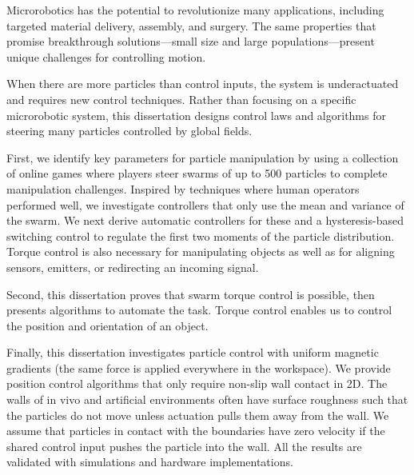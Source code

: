 


Microrobotics has the potential to revolutionize many applications, including targeted material delivery, assembly, and surgery.  The same properties that promise breakthrough solutions---small size and large populations---present unique challenges for controlling motion. 

 When there are more particles than control inputs, the system is underactuated and requires new control techniques.
 Rather than focusing on a specific microrobotic system, this dissertation designs control laws and algorithms for steering many particles controlled by global fields.

 
 First, we identify key parameters for particle manipulation by using a collection of online games where players steer swarms of up to 500 particles to complete manipulation challenges. Inspired by techniques where human operators performed well, we investigate controllers that only use the mean and variance of the swarm. We next derive automatic controllers for these and a hysteresis-based switching control to regulate the first two moments of the particle distribution. Torque control is also necessary for manipulating objects as well as for aligning sensors, emitters, or redirecting an incoming signal. 
 
 Second, this dissertation proves that swarm torque control is possible, then presents algorithms to automate the task. Torque control enables us to control the position and orientation of an object.

 
 Finally, this dissertation investigates particle control with uniform magnetic gradients (the same force is applied everywhere in the workspace).
 We provide position control algorithms that only require non-slip wall contact in 2D.
 The walls of in vivo and artificial environments often have surface roughness such that the particles do not move unless actuation pulls them away from the wall.
We assume that particles in contact with the boundaries have zero velocity if the shared control input pushes the particle into the wall. 
All the results are validated with simulations and hardware implementations.

